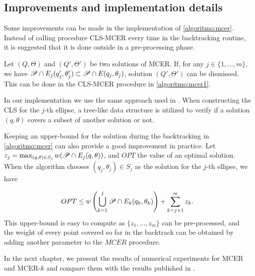 \subsection{Improvements and implementation details}

Some improvements can be made in the implementation of \autoref{algoritmo:mcer}.
Instead of calling procedure CLS-MCER every time in the backtracking routine, it is suggested that it is done outside in a pre-processing phase.

Let $(Q, \Theta)$ and $(Q', \Theta')$ be two solutions of MCER. If, for any $j \in \{1, \dots, m\}$, we have $\mathscr{P} \cap E_j(q_j', \theta_j') \subset \mathscr{P} \cap E(q_j, \theta_j)$, solution $(Q', \Theta')$ can be dismissed. This can be done in the CLS-MCER procedure in \autoref{algoritmo:mcer1}. 

In our implementation we use the same approach used in . When constructing the CLS for the $j$-th ellipse, a tree-like data structure is utilized to verify if a solution $(q, \theta)$ covers a subset of another solution or not.

Keeping an upper-bound for the solution during the backtracking in \autoref{algoritmo:mcer} can also provide a good improvement in practice. Let $z_j = \max_{(q, \theta) \in S_j} w(\mathscr{P} \cap E_j(q, \theta))$, and $OPT$ the value of an optimal solution. When the algorithm chooses $(q_j, \theta_j) \in S_j$ as the solution for the $j$-th ellipse, we have

\begin{equation}
OPT \le w\left(\bigcup_{k=1}^{j} \mathscr{P} \cap E_k(q_k, \theta_k)\right) + \sum_{k=j+1}^m z_k.
\end{equation}
This upper-bound is easy to compute as $\{z_1, \dots, z_m\}$ can be pre-processed, and the weight of every point covered so far in the backtrack can be obtained by adding another parameter to the $MCER$ procedure.

In the next chapter, we present the results of numerical experiments for MCER and MCER-$k$ and compare them with the results published in .